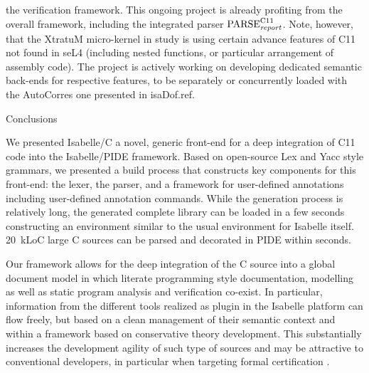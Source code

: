 \begin{isabellebody}
\begin{isamarkuptext}
the verification framework. This ongoing project is already profiting from the overall framework,
including the integrated parser $\text{PARSE}_{\text{\emph{report}}}^{\text{C11}}$. Note, however,
that the XtratuM micro-kernel \cite{DBLP:journals/sigbed/CarrascosaCMBC14} in study is using
certain advance features of C11 not found in seL4 (including nested functions, or particular
arrangement of assembly code). The project is actively working on developing dedicated semantic
back-ends for respective features, to be separately or concurrently loaded with the AutoCorres one
presented in \csname isaDof.ref.%
\end{isamarkuptext}\isamarkuptrue%
%
\begin{isamarkupsection*}%
[label = {concl},type = {scholarly_paper.conclusion}, args={label = {concl},type = {scholarly_paper.conclusion}, scholarly_paper.text_section.main_author = {@{docitem ''bu''}}, Isa_COL.text_element.level = {}, Isa_COL.text_element.referentiable = {False}, Isa_COL.text_element.variants = {{STR ''outline'', STR ''document''}}, scholarly_paper.text_section.fixme_list = {}, Isa_COL.text_element.level = {}}]Conclusions%
\end{isamarkupsection*}\isamarkuptrue%
%
\begin{isamarkuptext}%
We presented Isabelle/C a novel, generic front-end for a deep integration of C11 code into the 
Isabelle/PIDE framework. Based on open-source Lex and Yacc style grammars, we presented a build process 
that constructs key components for this front-end: the lexer, the parser, and a framework for 
user-defined annotations including user-defined annotation commands. 
While the generation process is relatively long, the generated complete library can be loaded in a 
few seconds constructing an environment similar to the usual  environment for 
Isabelle itself. 20~kLoC large  C sources can be parsed and decorated in PIDE within  seconds.

Our framework allows for the deep integration of the C source into a global document model in which 
literate programming style documentation, modelling as well as static program analysis and verification 
co-exist.  In particular, information from the different tools realized as plugin in the Isabelle 
platform  can flow freely, but based on a clean management of their semantic context and within a 
framework based on conservative theory development. This substantially increases the development agility 
of such type of sources and may be  attractive to  conventional developers, in particular when 
targeting formal certification \cite{DBLP:conf/mkm/BruckerACW18}.


\end{isamarkuptext}
\end{isabellebody}
